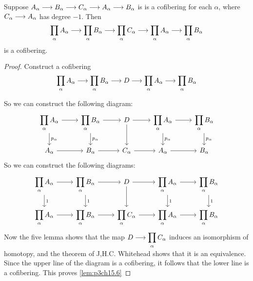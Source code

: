 \documentclass[../main]{subfiles}
\begin{document}
\begin{customlemma}{15.6}\label{lem:p3ch15.6}
Suppose $A_\alpha\overset{}{\longrightarrow}B_\alpha\overset{}{\longrightarrow}C_\alpha\overset{}{\longrightarrow}A_\alpha\overset{}{\longrightarrow}B_\alpha$ is is a cofibering for each $\alpha$, where $C_\alpha\overset{}{\longrightarrow}A_\alpha$ has degree $-1$. Then
$$\displaystyle\prod_\alpha A_\alpha\overset{}{\longrightarrow}\displaystyle\prod_\alpha B_\alpha\overset{}{\longrightarrow}\displaystyle\prod_\alpha C_\alpha\overset{}{\longrightarrow}\displaystyle\prod_\alpha A_\alpha\overset{}{\longrightarrow} \displaystyle\prod_\alpha B_\alpha$$
is a cofibering.
\end{customlemma}
\begin{proof}
Construct a cofibering 
$$\displaystyle\prod_\alpha A_\alpha\overset{}{\longrightarrow}\displaystyle\prod_\alpha B_\alpha\overset{}{\longrightarrow}D\overset{}{\longrightarrow}\displaystyle\prod_\alpha A_\alpha\overset{}{\longrightarrow} \displaystyle\prod_\alpha B_\alpha$$

So we can construct the following diagram:
$$
\begin{tikzcd}
    \displaystyle\prod_\alpha A_\alpha \arrow[r]\arrow[d,"p_\alpha"]   &\displaystyle\prod_\alpha B_\alpha \arrow[r]\arrow[d,"p_\alpha"] & D\arrow[r]\arrow[d] & \displaystyle\prod_\alpha A_\alpha\arrow[r]\arrow[d,"p_\alpha"] & \displaystyle\prod_\alpha B_\alpha \arrow[d,"p_\alpha"]\\
 A_\alpha\arrow[r] & B_\alpha\arrow[r] &  C_\alpha\arrow[r] &  A_\alpha\arrow[r] &  B_\alpha
\end{tikzcd}
$$
So we can construct the following diagrams:
$$
\begin{tikzcd}
    \displaystyle\prod_\alpha A_\alpha \arrow[r]\arrow[d,"1"]   &\displaystyle\prod_\alpha B_\alpha \arrow[r]\arrow[d,"1"] & D\arrow[r]\arrow[d] & \displaystyle\prod_\alpha A_\alpha\arrow[r]\arrow[d,"1"] & \displaystyle\prod_\alpha B_\alpha \arrow[d,"1"]\\
\displaystyle\prod_\alpha A_\alpha\arrow[r] & \displaystyle\prod_\alpha B_\alpha\arrow[r] & \displaystyle\prod_\alpha C_\alpha\arrow[r] & \displaystyle\prod_\alpha A_\alpha\arrow[r] & \displaystyle\prod_\alpha B_\alpha
\end{tikzcd}
$$
Now the five lemma shows that the map $D\overset{}{\longrightarrow}\displaystyle\prod_\alpha C_\alpha$ induces an isomorphism of homotopy, and the theorem of J,H.C. Whitehead shows
that it is an equivalence. Since the upper line of the diagram is a cofibering, it follows that the lower line is a cofibering. This proves \ref{lem:p3ch15.6}
\end{proof}
\end{document}
